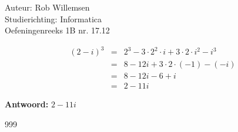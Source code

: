 \documentclass[a4paper]{article}
\begin{document}
\noindent \large Auteur: Rob Willemsen \\
\noindent \large Studierichting: Informatica\\
\noindent \large Oefeningenreeks 1B nr. 17.12\\

\medskip

\normalsize

\begin{eqnarray*}
  (2-i)^3 & = & 2^3 - 3 \cdot 2^2 \cdot i + 3 \cdot 2 \cdot i^2 - i^3 \\
          & = & 8 - 12i + 3 \cdot 2 \cdot (-1) - (-i) \\
          & = & 8 - 12i - 6 + i \\
          & = & 2 - 11i
\end{eqnarray*}

\begin{flushleft}
\textbf{Antwoord:} $2 - 11i$
\end{flushleft}

\begin{thebibliography}{999}
\end{thebibliography}
\end{document}
